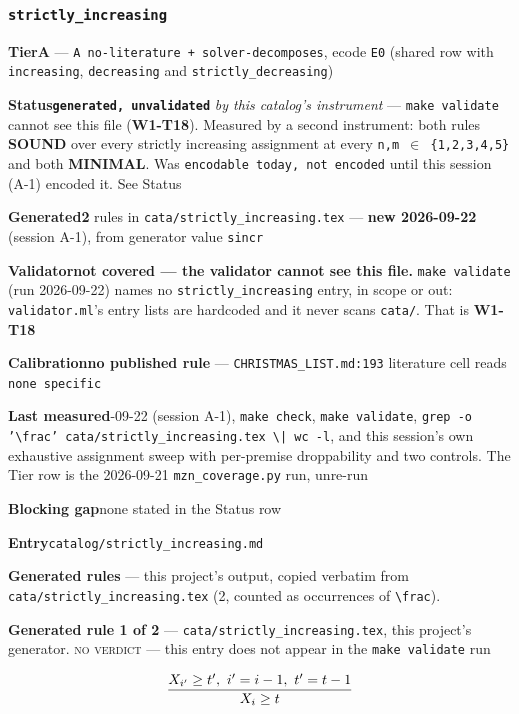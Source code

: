 \documentclass[10pt,a4paper]{article}
\newcommand{\entryfield}[2]{{\raggedright\textbf{#1}\quad #2\par}}
\newcommand{\rulebox}[1]{%
  \[\resizebox{\ifdim\width>\linewidth\linewidth\else\width\fi}{!}%
    {$\displaystyle #1$}\]}
\begin{document}
\subsubsection*{\texttt{strictly\_\allowbreak{}increasing}}
\label{entry:strictly-increasing}
\entryfield{Tier}{\textbf{A} --- \texttt{A no-\allowbreak{}literature + solver-\allowbreak{}decomposes}, ecode \texttt{E0} (shared row with \texttt{increasing}, \texttt{decreasing} and \texttt{strictly\_decreasing})}
\entryfield{Status}{\textbf{\texttt{generated, unvalidated}} \emph{by this catalog's instrument} --- \texttt{make validate} cannot see this file (\textbf{W1-T18}). Measured by a second instrument: both rules \textbf{SOUND} over every strictly increasing assignment at every \texttt{n,m $\in$ \{1,2,3,4,5\}} and both \textbf{MINIMAL}. Was \texttt{encodable today, not encoded} until this session (A-1) encoded it. See Status}
\entryfield{Generated}{\textbf{2} rules in \texttt{cata/\allowbreak{}strictly\_\allowbreak{}increasing.\allowbreak{}tex} --- \textbf{new 2026-09-22} (session A-1), from generator value \texttt{sincr}}
\entryfield{Validator}{\textbf{not covered --- the validator cannot see this file.} \texttt{make validate} (run 2026-09-22) names no \texttt{strictly\_increasing} entry, in scope or out: \texttt{validator.ml}'s entry lists are hardcoded and it never scans \texttt{cata/}. That is \textbf{W1-T18}}
\entryfield{Calibration}{\textbf{no published rule} --- \texttt{CHRISTMAS\_LIST.md:193} literature cell reads \texttt{none specific}}
\entryfield{Last measured}{2026-09-22 (session A-1), \texttt{make check}, \texttt{make validate}, \texttt{grep -\allowbreak{}o '\textbackslash{}frac' cata/\allowbreak{}strictly\_\allowbreak{}increasing.\allowbreak{}tex \textbackslash{}| wc -\allowbreak{}l}, and this session's own exhaustive assignment sweep with per-premise droppability and two controls. The Tier row is the 2026-09-21 \texttt{mzn\_coverage.py} run, unre-run}
\entryfield{Blocking gap}{none stated in the Status row}
\entryfield{Entry}{\texttt{catalog/strictly\_increasing.md}}

\textbf{Generated rules} --- this project's output, copied verbatim from \texttt{cata/strictly\_increasing.tex} (2, counted as occurrences of \texttt{\textbackslash{}frac}).\par

{\small\textbf{Generated rule 1 of 2} --- \texttt{cata/strictly\_increasing.tex}, this project's generator. \textsc{no verdict} --- this entry does not appear in the \texttt{make validate} run\par}
\rulebox{\frac{X_{i'} \geq t',~i'=i-1,~t'=t-1}{X_{i} \geq t}}
\end{document}
